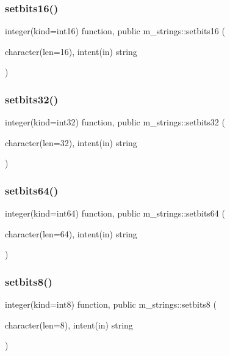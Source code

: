 \subsubsection{\texorpdfstring{setbits16()}{setbits16()}}
{\footnotesize\ttfamily integer(kind=int16) function, public m\+\_\+strings\+::setbits16 (\begin{DoxyParamCaption}\item[{character(len=16), intent(in)}]{string }\end{DoxyParamCaption})}

\mbox{\label{namespacem__strings_a44fd7db30f28fd30086eff1a59fbfa7e}} 
\subsubsection{\texorpdfstring{setbits32()}{setbits32()}}
{\footnotesize\ttfamily integer(kind=int32) function, public m\+\_\+strings\+::setbits32 (\begin{DoxyParamCaption}\item[{character(len=32), intent(in)}]{string }\end{DoxyParamCaption})}

\mbox{\label{namespacem__strings_a3d005819ec07b086dbc6d1c197834142}} 
\subsubsection{\texorpdfstring{setbits64()}{setbits64()}}
{\footnotesize\ttfamily integer(kind=int64) function, public m\+\_\+strings\+::setbits64 (\begin{DoxyParamCaption}\item[{character(len=64), intent(in)}]{string }\end{DoxyParamCaption})}

\mbox{\label{namespacem__strings_acc1854720186b8a5582a339d1cbb134b}} 
\subsubsection{\texorpdfstring{setbits8()}{setbits8()}}
{\footnotesize\ttfamily integer(kind=int8) function, public m\+\_\+strings\+::setbits8 (\begin{DoxyParamCaption}\item[{character(len=8), intent(in)}]{string }\end{DoxyParamCaption})}

